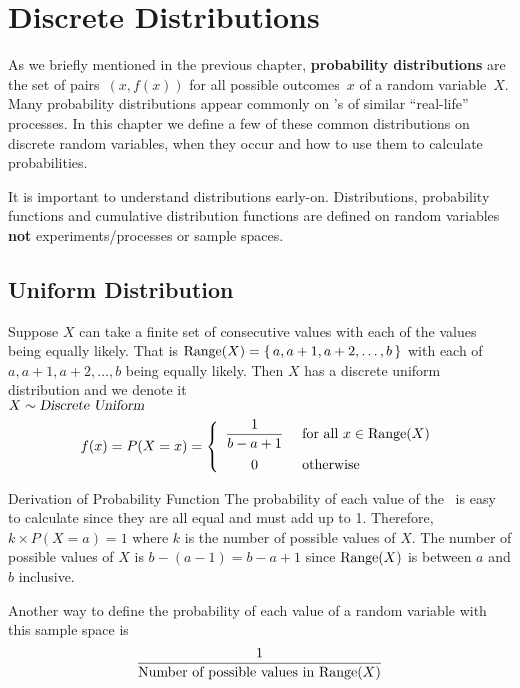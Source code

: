 \chapter{Discrete Distributions}
As we briefly mentioned in the previous chapter, \textbf{probability distributions} are the set of pairs~$(x,f(x))$ for all possible outcomes~$x$ of a random variable~$X$. Many probability distributions appear commonly on \rv's of similar ``real-life'' processes. In this chapter we define a few of these common distributions on discrete random variables, when they occur and how to use them to calculate probabilities.
\begin{info}
It is important to understand distributions early-on. Distributions, probability functions and cumulative distribution functions are defined on random variables \textbf{not} experiments/processes or sample spaces.
\end{info}

\section{Uniform Distribution}
Suppose $X$ can take a finite set of consecutive values with each of the values being equally likely. That is $\operatorname{Range}(X) = \{\, a,a+1,a+2,\ldots,b \,\}$ with each of $a,a+1,a+2,\ldots,b$ being equally likely. Then $X$ has a discrete uniform distribution and we denote it \\
$X \sim \operatorname{\textsl{Discrete Uniform}}$
\[
    f(x) = P(X = x) = \left\{
    \begin{array}{c@{\hspace{1em}}l}
        \displaystyle\frac{1}{b - a + 1} & \for\all x\in\range{X} \\[1em]
         0 & \ow 
    \end{array}\right.
\]
\begin{theory}{Derivation of Probability Function}
The probability of each value of the \rv~is easy to calculate since they are all equal and must add up to 1. Therefore, $k \times P(X = a) = 1$ where $k$ is the number of possible values of $X$. The number of possible values of $X$ is $b - (a - 1) = b - a + 1$ since $\operatorname{Range}(X)$ is between $a$ and $b$ inclusive.
\end{theory}
\begin{info}
Another way to define the probability of each value of a random variable with this sample space is 
\[
\frac{1}{\text{Number of possible values in $\operatorname{Range}(X)$}}
\]
\end{info}
